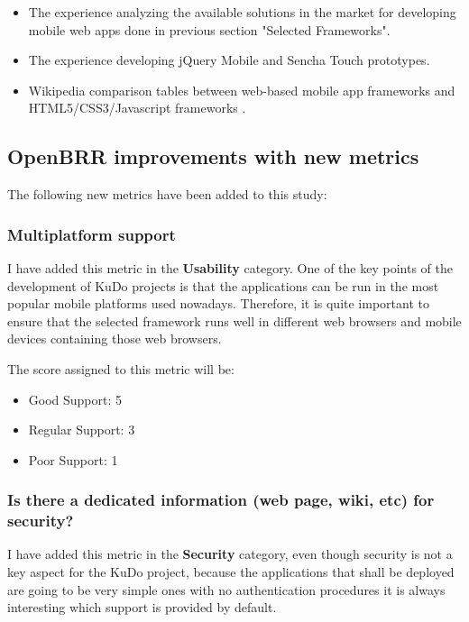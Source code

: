 \documentclass[a4paper,12pt]{book}
\begin{document}
\begin{itemize}
 \item The experience analyzing the available solutions in the market for developing mobile web apps done in previous section "Selected Frameworks".
  \item The experience developing jQuery Mobile and Sencha Touch prototypes.
 \item Wikipedia comparison tables between web-based mobile app frameworks \cite{wikipedia1}  and HTML5/CSS3/Javascript frameworks \cite{wikipedia2}.
\end{itemize}

\subsection{OpenBRR improvements with new metrics}
\label{OpenBRR improvements with new metrics}

The following new metrics have been added to this study:

\subsubsection{Multiplatform support}
\label{Multiplatform support}

I have added this metric in the \textbf{Usability} category. One of the key points of the development of KuDo projects is that the applications can be run in the most popular mobile platforms used nowadays. Therefore, it is quite important to ensure that the selected framework runs well in different web browsers and mobile devices containing those web browsers.

The score assigned to this metric will be:
\begin{itemize}
 \item Good Support: 5
 \item Regular Support: 3
 \item Poor Support: 1
\end{itemize}

\subsubsection{Is there a dedicated information (web page, wiki, etc) for security?}
\label{Is there a dedicated information (web page, wiki, etc) for security?}

I have added this metric in the \textbf{Security} category, even though security is not a key aspect for the KuDo project, because the applications that shall be deployed are going to be very simple ones with no authentication procedures it is always interesting which support is provided by default.
\end{document}
